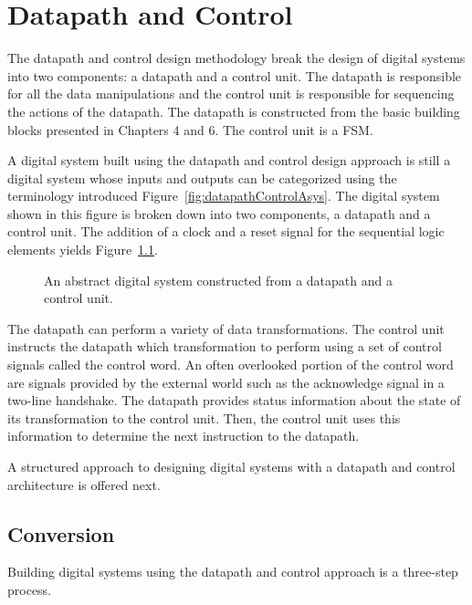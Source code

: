 \chapter{Datapath and Control}
\label{chapter:Datapath and Control}
\graphicspath{ {./chapter08/Fig} }

The datapath and control design methodology break the design
of digital systems into two components: a datapath and a control
unit.  The datapath is responsible for all the data manipulations
and the control unit is responsible for sequencing the
actions of the datapath.  The datapath is constructed from the basic
building blocks presented in Chapters 4 and 6.  The control unit is
a FSM.

A digital system built using the datapath and control design approach
is still a digital system whose inputs and outputs can be categorized
using the terminology introduced Figure~\ref{fig:datapathControlAsys}.  The
digital system shown in this figure is broken down into two components,
a datapath and a control unit.  The addition of a clock and a reset signal for the
sequential logic elements yields Figure~\ref{fig:datapathControlAbstract}.

\begin{figure}[ht]
    \caption{An abstract digital system constructed from a datapath and
    a control unit.}
    \label{fig:datapathControlAbstract}
\end{figure}
\label{page:Abstract}

The datapath can perform a variety of data transformations.  The control
unit instructs the datapath which transformation to perform using a set
of control signals called the control word.  An often overlooked portion
of the control word are signals provided by the external world such as
the acknowledge signal in a two-line handshake.  The datapath
provides status information about the state of its transformation to the
control unit.  Then, the control unit uses this information to determine
the next instruction to the datapath.

A structured approach to designing digital systems with a
datapath and control architecture is offered next.

\section{Conversion}
Building digital systems using the datapath and control approach is a
three-step process.


